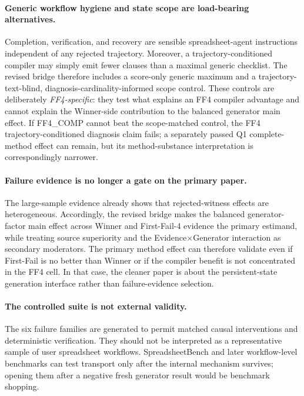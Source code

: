 \paragraph{Generic workflow hygiene and state scope are load-bearing alternatives.}
Completion, verification, and recovery are sensible spreadsheet-agent instructions independent of any rejected trajectory. Moreover, a trajectory-conditioned compiler may simply emit fewer clauses than a maximal generic checklist. The revised bridge therefore includes a score-only generic maximum and a trajectory-text-blind, diagnosis-cardinality-informed scope control. These controls are deliberately \emph{FF4-specific}: they test what explains an FF4 compiler advantage and cannot explain the Winner-side contribution to the balanced generator main effect. If FF4\_COMP cannot beat the scope-matched control, the FF4 trajectory-conditioned diagnosis claim fails; a separately passed Q1 complete-method effect can remain, but its method-substance interpretation is correspondingly narrower.

\paragraph{Failure evidence is no longer a gate on the primary paper.}
The large-sample evidence already shows that rejected-witness effects are heterogeneous. Accordingly, the revised bridge makes the balanced generator-factor main effect across Winner and First-Fail-4 evidence the primary estimand, while treating source superiority and the Evidence$\times$Generator interaction as secondary moderators. The primary method effect can therefore validate even if First-Fail is no better than Winner or if the compiler benefit is not concentrated in the FF4 cell. In that case, the cleaner paper is about the persistent-state generation interface rather than failure-evidence selection.

\paragraph{The controlled suite is not external validity.}
The six failure families are generated to permit matched causal interventions and deterministic verification. They should not be interpreted as a representative sample of user spreadsheet workflows. SpreadsheetBench and later workflow-level benchmarks can test transport only after the internal mechanism survives; opening them after a negative fresh generator result would be benchmark shopping.

